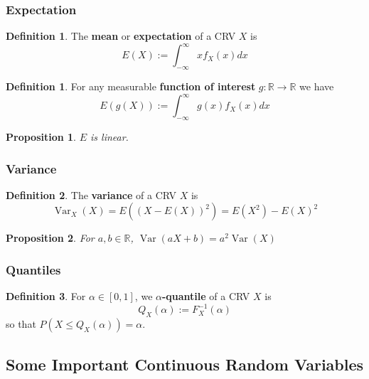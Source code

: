 \documentclass[12pt]{article}
\newtheorem*{prop*}{Proposition}
\theoremstyle{definition}
\newtheorem{defn}{Definition}[subsection]
\newtheorem*{defn*}{Definition}
\newcommand{\R}{\mathbb{R}}
\DeclareMathOperator{\Var}{Var}
\begin{document}
\subsubsection{Expectation}

\begin{defn}
  The \textbf{mean} or \textbf{expectation} of a CRV $X$ is
  $$E(X) := \int_{-\infty}^{\infty}xf_X(x)dx$$
\end{defn}

\begin{defn*}
  For any measurable \textbf{function of interest} $g : \R \to \R$ we have
  $$E(g(X)) := \int_{-\infty}^{\infty}g(x)f_X(x)dx$$
\end{defn*}

\begin{prop*}
  $E$ is linear.
\end{prop*}

\subsubsection{Variance}

\begin{defn}
  The \textbf{variance} of a CRV $X$ is
  $$\Var_X(X) = E((X - E(X))^2) = E(X^2) - E(X)^2$$
\end{defn}

\begin{prop*}
  For $a, b \in \R$, $\Var(aX + b) = a^2\Var(X)$
\end{prop*}

\subsubsection{Quantiles}

\begin{defn}
  For $\alpha \in [0, 1]$, we \textbf{$\alpha$-quantile} of a CRV $X$ is
  $$Q_X(\alpha) := F_X^{-1}(\alpha)$$
  so that $P(X \leq Q_X(\alpha)) = \alpha$.
\end{defn}

\subsection{Some Important Continuous Random Variables}
\end{document}
